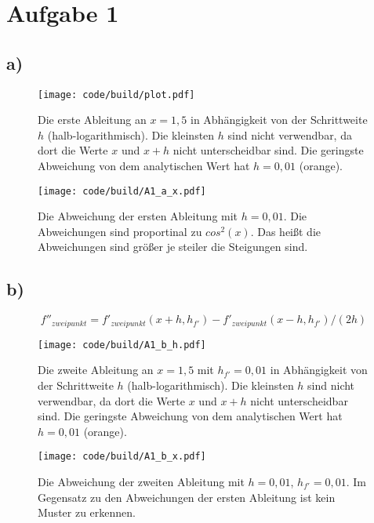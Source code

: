 \FloatBarrier
\section{Aufgabe 1}
\label{sec:A1}
\subsection{a)}
\begin{figure}
    \centering
    \texttt{[image: code/build/plot.pdf]}
    \caption{Die erste Ableitung an $x=1,5$ in Abhängigkeit von der Schrittweite $h$ (halb-logarithmisch).
    Die kleinsten $h$ sind nicht verwendbar, da dort die Werte $x$ und $x+h$ nicht unterscheidbar sind.
    Die geringste Abweichung von dem analytischen Wert hat $h=0,01$ (orange).}
\end{figure}

\begin{figure}
    \centering
    \texttt{[image: code/build/A1\_a\_x.pdf]}
    \caption{Die Abweichung der ersten Ableitung mit $h=0,01$. Die Abweichungen sind proportinal zu $cos^2(x)$.
    Das heißt die Abweichungen sind größer je steiler die Steigungen sind.}
\end{figure}
\FloatBarrier
\FloatBarrier
\subsection{b)}

\begin{equation}
    f''_{zweipunkt}= f'_{zweipunkt}( x+h,h_{f'}) - f'_{zweipunkt}( x-h,h_{f'}) / (2h)
\end{equation}

\begin{figure}
    \centering
    \texttt{[image: code/build/A1\_b\_h.pdf]}
    \caption{Die zweite Ableitung an $x=1,5$ mit $h_{f'}=0,01$ in Abhängigkeit von der Schrittweite $h$ (halb-logarithmisch).
    Die kleinsten $h$ sind nicht verwendbar, da dort die Werte $x$ und $x+h$ nicht unterscheidbar sind.
    Die geringste Abweichung von dem analytischen Wert hat $h=0,01$ (orange).}
\end{figure}

\begin{figure}
    \centering
    \texttt{[image: code/build/A1\_b\_x.pdf]}
    \caption{Die Abweichung der zweiten Ableitung mit $h=0,01$, $h_{f'}=0,01$. 
    Im Gegensatz zu den Abweichungen der ersten Ableitung ist kein Muster zu erkennen.}
\end{figure}
\FloatBarrier
\FloatBarrier

